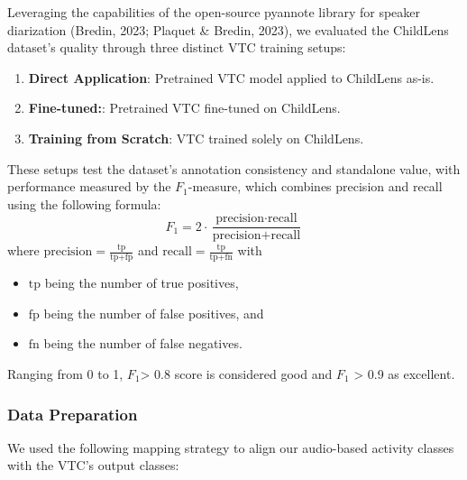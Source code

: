 \documentclass[
  man,floatsintext]{apa6}
\providecommand{\tightlist}{%
  \setlength{\itemsep}{0pt}\setlength{\parskip}{0pt}}
\begin{document}
Leveraging the capabilities of the open-source pyannote library for speaker diarization (Bredin, 2023; Plaquet \& Bredin, 2023), we evaluated the ChildLens dataset's quality through three distinct VTC training setups:

\begin{enumerate}
\def\labelenumi{\arabic{enumi}.}
\tightlist
\item
  \textbf{Direct Application}: Pretrained VTC model applied to ChildLens as-is.
\item
  \textbf{Fine-tuned:}: Pretrained VTC fine-tuned on ChildLens.
\item
  \textbf{Training from Scratch}: VTC trained solely on ChildLens.
\end{enumerate}

These setups test the dataset's annotation consistency and standalone value, with performance measured by the \(F_1\)-measure, which combines precision and recall using the following formula:
\[
F_1 = 2 \cdot \frac{\text{precision} \cdot \text{recall}}{\text{precision} + \text{recall}}
\]
where \(\text{precision} = \frac{\text{tp}}{\text{tp} + \text{fp}}\) and \(\text{recall} = \frac{\text{tp}}{\text{tp} + \text{fn}}\) with

\begin{itemize}
\tightlist
\item
  \(\text{tp}\) being the number of true positives,
\item
  \(\text{fp}\) being the number of false positives, and
\item
  \(\text{fn}\) being the number of false negatives.
\end{itemize}

Ranging from 0 to 1, \(F_1\)\textgreater{} 0.8 score is considered good and \(F_1\) \textgreater{} 0.9 as excellent.

\subsubsection{Data Preparation}\label{data-preparation-1}

We used the following mapping strategy to align our audio-based activity classes with the VTC's output classes:
\end{document}
